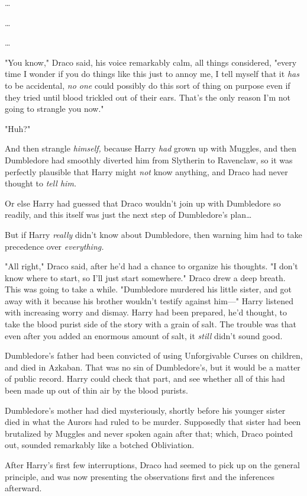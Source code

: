 {\ldots}

{\ldots}

{\ldots}

"You know," Draco said, his voice remarkably calm, all things considered, 
"every time I wonder if you do things like this just to annoy me, I tell myself 
that it \emph{has} to be accidental, \emph{no one} could possibly do this sort 
of thing on purpose even if they tried until blood trickled out of their ears. 
That's the only reason I'm not going to strangle you now."

"Huh?"

And then strangle \emph{himself,} because Harry \emph{had} grown up with 
Muggles, and then Dumbledore had smoothly diverted him from Slytherin to 
Ravenclaw, so it was perfectly plausible that Harry might \emph{not} know 
anything, and Draco had never thought to \emph{tell him.}

Or else Harry had guessed that Draco wouldn't join up with Dumbledore so 
readily, and this itself was just the next step of Dumbledore's plan{\ldots}

But if Harry \emph{really} didn't know about Dumbledore, then warning him had 
to take precedence over \emph{everything.}

"All right," Draco said, after he'd had a chance to organize his thoughts. "I 
don't know where to start, so I'll just start somewhere." Draco drew a deep 
breath. This was going to take a while. "Dumbledore murdered his little sister, 
and got away with it because his brother wouldn't testify against him---"
\sbreak
Harry listened with increasing worry and dismay. Harry had been prepared, he'd 
thought, to take the blood purist side of the story with a grain of salt. The 
trouble was that even after you added an enormous amount of salt, it 
\emph{still} didn't sound good.

Dumbledore's father had been convicted of using Unforgivable Curses on 
children, and died in Azkaban. That was no sin of Dumbledore's, but it would be 
a matter of public record. Harry could check that part, and see whether all of 
this had been made up out of thin air by the blood purists.

Dumbledore's mother had died mysteriously, shortly before his younger sister 
died in what the Aurors had ruled to be murder. Supposedly that sister had been 
brutalized by Muggles and never spoken again after that; which, Draco pointed 
out, sounded remarkably like a botched Obliviation.

After Harry's first few interruptions, Draco had seemed to pick up on the 
general principle, and was now presenting the observations first and the 
inferences afterward.

